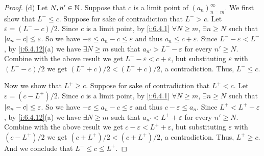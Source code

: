 \begin{proof}{(d)}
  Let \(N, n' \in \mathbb{N}\).
  Suppose that \(c\) is a limit point of \((a_n)_{n = m}^\infty\).
  We first show that \(L^- \leq c\).
  Suppose for sake of contradiction that \(L^- > c\).
  Let \(\varepsilon = (L^- - c) / 2\).
  Since \(c\) is a limit point, by \cref{i:6.4.1} \(\forall N \geq m\), \(\exists n \geq N\) such that \(\left\lvert a_n - c\right\rvert \leq \varepsilon\).
  So we have \(-\varepsilon \leq a_n - c \leq \varepsilon\) and thus \(a_n \leq c + \varepsilon\).
  Since \(L^- - \varepsilon < L^-\), by \cref{i:6.4.12}(a) we have \(\exists N \geq m\) such that \(a_{n'} > L^- - \varepsilon\) for every \(n' \geq N\).
  Combine with the above result we get \(L^- - \varepsilon < c + \varepsilon\), but substituting \(\varepsilon\) with \((L^- - c) / 2\) we get \((L^- + c) / 2 < (L^- + c) / 2\), a contradiction.
  Thus, \(L^- \leq c\).

  Now we show that \(L^+ \geq c\).
  Suppose for sake of contradiction that \(L^+ < c\).
  Let \(\varepsilon = (c - L^+) / 2\).
  Since \(c\) is a limit point, by \cref{i:6.4.1} \(\forall N \geq m\), \(\exists n \geq N\) such that \(\left\lvert a_n - c\right\rvert \leq \varepsilon\).
  So we have \(-\varepsilon \leq a_n - c \leq \varepsilon\) and thus \(c - \varepsilon \leq a_n\).
  Since \(L^+ < L^+ + \varepsilon\), by \cref{i:6.4.12}(a) we have \(\exists N \geq m\) such that \(a_{n'} < L^+ + \varepsilon\) for every \(n' \geq N\).
  Combine with the above result we get \(c - \varepsilon < L^+ + \varepsilon\), but substituting \(\varepsilon\) with \((c - L^+) / 2\) we get \((c + L^+) / 2 < (c + L^+) / 2\), a contradiction.
  Thus, \(L^+ \geq c\).
  And we conclude that \(L^- \leq c \leq L^+\).
\end{proof}

